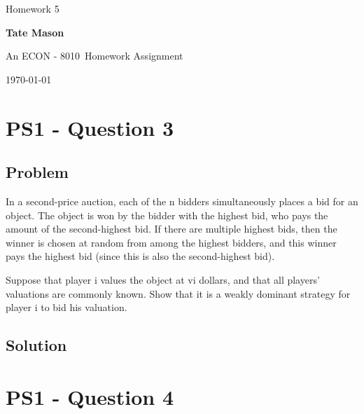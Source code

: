 \documentclass[10pt, a4paper]{article}
\newcommand\course{ECON - 8010}                            %
\newcommand\hwnumber{ 5}                                 %
\newcommand\Information{Tate Mason}                        %
\begin{document}
  \begin{titlepage}
    \begin{center}
      \vspace*{3cm}
            
        \vspace{1cm}
        \huge
        Homework \hwnumber
            
        \vspace{1.5cm}
        \Large
            
        \textbf{\Information}                      %
            
        \vfill
        
        An \course \ Homework Assignment
            
        \vspace{1cm}
        \Large

        
        \today
            
    \end{center}
  \end{titlepage}

  \newpage
\section*{PS1 - Question 3}
  \subsection*{Problem}
    In a second-price auction, each of the n bidders simultaneously places a bid for an
    object. The object is won by the bidder with the highest bid, who pays the amount of
    the second-highest bid. If there are multiple highest bids, then the winner is chosen at random from among the highest bidders, and this winner pays the highest bid (since this is also the second-highest bid).

    Suppose that player i values the object at vi dollars, and that all players’ valuations are commonly known. Show that it is a weakly dominant strategy for player i to bid his valuation.
  \subsection*{Solution}
\section*{PS1 - Question 4}
\end{document}
